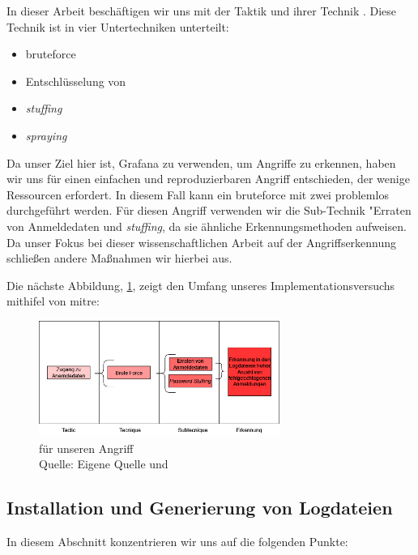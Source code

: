 In dieser Arbeit beschäftigen wir uns mit der Taktik  und ihrer Technik . Diese Technik ist in vier Untertechniken unterteilt:

{
\begin{itemize}[noitemsep]
   \item \gls{bruteforce}
   \item	Entschlüsselung von 
   \item \textit{\gls{stuffing}}
   \item \textit{\gls{spraying}}
\end{itemize}
}

Da unser Ziel hier ist, Grafana zu verwenden, um Angriffe zu erkennen, haben wir uns für einen einfachen und reproduzierbaren Angriff entschieden, der wenige Ressourcen erfordert. In diesem Fall kann ein \gls{bruteforce} mit zwei  problemlos durchgeführt werden. Für diesen Angriff verwenden wir die Sub-Technik "Erraten von Anmeldedaten und \textit{\gls{stuffing}}, da sie ähnliche Erkennungsmethoden aufweisen. Da unser Fokus bei dieser wissenschaftlichen Arbeit auf der Angriffserkennung schließen andere Maßnahmen  wir hierbei aus.

Die nächste Abbildung, \ref{fig:Unser_ttp}, zeigt den Umfang unseres Implementationsversuchs mithifel von \gls{mitre}:
\begin{figure}[H]
   \centering
   \includegraphics[width=0.7\textwidth]{assets/T1110.drawio.png}
   \caption[ für unseren Angriff]
   { für unseren Angriff \\Quelle: Eigene Quelle und \citep{Mitre_t1110}}
   \label{fig:Unser_ttp}
   \centering
\end{figure}

\newpage
\subsection{Installation und Generierung von Logdateien}
In diesem Abschnitt konzentrieren wir uns auf die folgenden Punkte:

